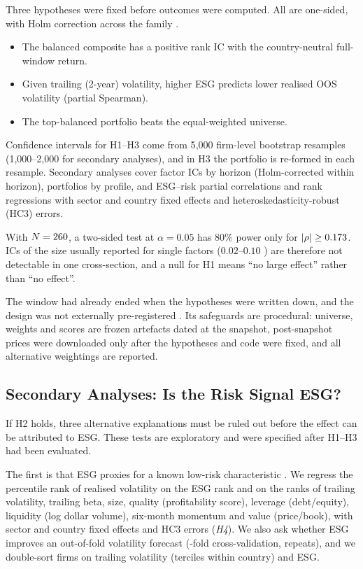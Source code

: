 Three hypotheses were fixed before outcomes were computed. All are
one-sided, with Holm correction across the family \cite{holm_1979}.
\begin{itemize}
\item[\textbf{H1}] The balanced composite has a positive rank IC with the
  country-neutral full-window return.
\item[\textbf{H2}] Given trailing (2-year) volatility, higher ESG predicts lower
  realised OOS volatility (partial Spearman).
\item[\textbf{H3}] The top-\TopN balanced portfolio beats the equal-weighted
  universe.
\end{itemize}
Confidence intervals for H1--H3 come from 5{,}000 firm-level bootstrap
resamples (1{,}000--2{,}000 for secondary analyses), and in H3 the portfolio
is re-formed in each resample. Secondary analyses cover factor ICs by
horizon (Holm-corrected within horizon), portfolios by profile, and
ESG--risk partial correlations and rank regressions with sector and country
fixed effects and heteroskedasticity-robust (HC3) errors.

With $N=260$, a two-sided test at $\alpha=0.05$ has 80\% power only for
$|\rho|\ge0.173$. ICs of the size usually reported for single factors
($0.02$--$0.10$ \cite{grinold_kahn_2000}) are therefore not detectable in one
cross-section, and a null for H1 means ``no large effect'' rather than ``no
effect''.

The window had already ended when the hypotheses were written down, and the
design was not externally pre-registered \cite{nosek_2018}. Its safeguards
are procedural: universe, weights and scores are frozen artefacts dated at
the snapshot, post-snapshot prices were downloaded only after the hypotheses
and code were fixed, and all alternative weightings are reported.

\subsection{Secondary Analyses: Is the Risk Signal ESG?}
\label{sec:ext_design}

If H2 holds, three alternative explanations must be ruled out before the
effect can be attributed to ESG. These tests are exploratory and were
specified after H1--H3 had been evaluated.

The first is that ESG proxies for a known low-risk characteristic
\cite{ang_2006, frazzini_pedersen_2014, asness_2019}. We regress the
percentile rank of realised volatility on the ESG rank and on the ranks of
trailing volatility, trailing beta, size, quality (profitability score),
leverage (debt/equity), liquidity (log dollar volume), six-month momentum and
value (price/book), with sector and country fixed effects and HC3 errors
(\emph{H4}). We also ask whether ESG improves an out-of-fold volatility
forecast (\CVFolds-fold cross-validation, \CVRepeats repeats), and we
double-sort firms on trailing volatility (terciles within country) and ESG.

